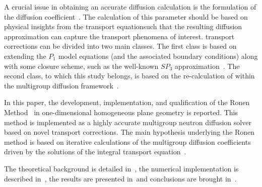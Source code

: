 A crucial issue in obtaining an accurate diffusion calculation is the formulation of the diffusion coefficient~\cite{Bell-1970,Pounders-2009}. The calculation of this parameter should be based on physical insights from the transport equation\DIFaddbegin \DIFadd{, }\DIFaddend such that the resulting \DIFdelbegin {}\DIFdelend diffusion approximation can \DIFaddbegin {}\DIFaddend capture the transport phenomena of interest. \DIFdelbegin {}\DIFdelend \DIFaddbegin {}\DIFaddend transport corrections can be divided into two main classes. The first class is based on extending the $P_1$ model equations (and the associated boundary conditions) along with some closure scheme, such as the well-known $SP_3$ approximation~\cite{Brantley-2000}. The second class, to which this study belongs, is based on the re-calculation of \DIFdelbegin {}\DIFdelend \DIFaddbegin {}\DIFaddend within the multigroup diffusion framework~\cite{Tomatis-2011}. 

In this paper, the development, implementation, and qualification of the Ronen Method~\cite{Ronen-2004} in one-dimensional homogeneous \DIFaddbegin {}\DIFaddend plane geometry is reported. This method is implemented as a highly accurate multigroup neutron diffusion solver based on novel transport corrections. The main hypothesis underlying the Ronen method is based on iterative calculations of the multigroup diffusion coefficients driven by the solutions of the integral transport equation~\cite{Ronen-2004,Tomatis-2011}. 


The theoretical background is detailed in~, the numerical implementation is described in~, the results are presented in~\DIFaddbegin \DIFadd{, }\DIFaddend and conclusions are brought in~.

